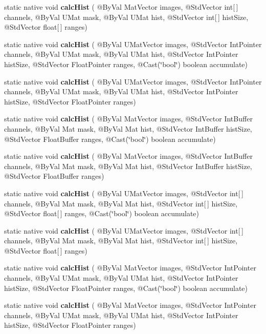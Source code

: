 \begin{DoxyCompactItemize}
static native void {\bfseries calc\+Hist} ( @By\+Val Mat\+Vector images, @Std\+Vector int\mbox{[}$\,$\mbox{]} channels, @By\+Val U\+Mat mask, @By\+Val U\+Mat hist, @Std\+Vector int\mbox{[}$\,$\mbox{]} hist\+Size, @Std\+Vector float\mbox{[}$\,$\mbox{]} ranges)
\item 
static native void {\bfseries calc\+Hist} ( @By\+Val U\+Mat\+Vector images, @Std\+Vector Int\+Pointer channels, @By\+Val U\+Mat mask, @By\+Val U\+Mat hist, @Std\+Vector Int\+Pointer hist\+Size, @Std\+Vector Float\+Pointer ranges, @Cast(\char`\"{}bool\char`\"{}) boolean accumulate)
\item 
static native void {\bfseries calc\+Hist} ( @By\+Val U\+Mat\+Vector images, @Std\+Vector Int\+Pointer channels, @By\+Val U\+Mat mask, @By\+Val U\+Mat hist, @Std\+Vector Int\+Pointer hist\+Size, @Std\+Vector Float\+Pointer ranges)
\item 
static native void {\bfseries calc\+Hist} ( @By\+Val Mat\+Vector images, @Std\+Vector Int\+Buffer channels, @By\+Val Mat mask, @By\+Val Mat hist, @Std\+Vector Int\+Buffer hist\+Size, @Std\+Vector Float\+Buffer ranges, @Cast(\char`\"{}bool\char`\"{}) boolean accumulate)
\item 
static native void {\bfseries calc\+Hist} ( @By\+Val Mat\+Vector images, @Std\+Vector Int\+Buffer channels, @By\+Val Mat mask, @By\+Val Mat hist, @Std\+Vector Int\+Buffer hist\+Size, @Std\+Vector Float\+Buffer ranges)
\item 
static native void {\bfseries calc\+Hist} ( @By\+Val U\+Mat\+Vector images, @Std\+Vector int\mbox{[}$\,$\mbox{]} channels, @By\+Val Mat mask, @By\+Val Mat hist, @Std\+Vector int\mbox{[}$\,$\mbox{]} hist\+Size, @Std\+Vector float\mbox{[}$\,$\mbox{]} ranges, @Cast(\char`\"{}bool\char`\"{}) boolean accumulate)
\item 
static native void {\bfseries calc\+Hist} ( @By\+Val U\+Mat\+Vector images, @Std\+Vector int\mbox{[}$\,$\mbox{]} channels, @By\+Val Mat mask, @By\+Val Mat hist, @Std\+Vector int\mbox{[}$\,$\mbox{]} hist\+Size, @Std\+Vector float\mbox{[}$\,$\mbox{]} ranges)
\item 
static native void {\bfseries calc\+Hist} ( @By\+Val Mat\+Vector images, @Std\+Vector Int\+Pointer channels, @By\+Val U\+Mat mask, @By\+Val U\+Mat hist, @Std\+Vector Int\+Pointer hist\+Size, @Std\+Vector Float\+Pointer ranges, @Cast(\char`\"{}bool\char`\"{}) boolean accumulate)
\item 
static native void {\bfseries calc\+Hist} ( @By\+Val Mat\+Vector images, @Std\+Vector Int\+Pointer channels, @By\+Val U\+Mat mask, @By\+Val U\+Mat hist, @Std\+Vector Int\+Pointer hist\+Size, @Std\+Vector Float\+Pointer ranges)

\end{DoxyCompactItemize}
